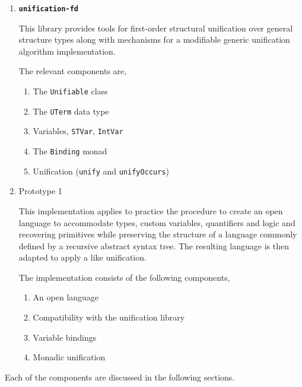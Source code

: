 \documentclass[thesis-solanki.tex]{subfiles}
\providecommand\codeLibrary[1]{\texttt{\bfseries #1}}
\begin{document}
\begin{enumerate}
\item \codeLibrary{unification-fd} \cite{unification-fd-lib}

This library provides tools for first-order structural unification over general structure types along with mechanisms for a modifiable
generic unification algorithm implementation.

The relevant components are,
\begin{enumerate}
\item The \Verb!Unifiable! class

\item The \Verb!UTerm! data type

\item Variables,
  \Verb!STVar!, \Verb!IntVar!

\item The \Verb!Binding! monad

\item Unification (\Verb!unify! and \Verb!unifyOccurs!)
\end{enumerate}

\item Prototype 1

  This implementation applies to practice the procedure to create an open language to accommodate types,
  custom variables, quantifiers and logic and recovering primitives while preserving the structure of a
  language commonly defined by a recursive abstract syntax tree.
  The resulting language is then adapted to apply a  like unification.

The implementation consists of the following components,
\begin{enumerate}
\item An open language

\item Compatibility with the unification library \cite{unification-fd-lib}

\item Variable bindings

\item Monadic unification

\end{enumerate}
\end{enumerate}

Each of the components are discussed in the following sections.
\end{document}
